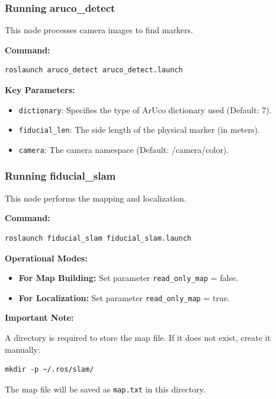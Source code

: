 \documentclass[10pt]{article}
\begin{document}
\subsubsection*{Running aruco\_detect}

This node processes camera images to find markers.

\textbf{Command:}

\begin{verbatim}
roslaunch aruco_detect aruco_detect.launch
\end{verbatim}

\textbf{Key Parameters:}
\begin{itemize}
    \item \texttt{dictionary}: Specifies the type of ArUco dictionary used (Default: 7).
    \item \texttt{fiducial\_len}: The side length of the physical marker (in meters).
    \item \texttt{camera}: The camera namespace (Default: /camera/color).
\end{itemize}

\subsubsection*{Running fiducial\_slam}

This node performs the mapping and localization.

\textbf{Command:}

\begin{verbatim}
roslaunch fiducial_slam fiducial_slam.launch
\end{verbatim}

\textbf{Operational Modes:}
\begin{itemize}
    \item \textbf{For Map Building:} Set parameter \texttt{read\_only\_map} = false.
    \item \textbf{For Localization:} Set parameter \texttt{read\_only\_map} = true.
\end{itemize}

\textbf{Important Note:}

A directory is required to store the map file. If it does not exist, create it manually:

\begin{verbatim}
mkdir -p ~/.ros/slam/
\end{verbatim}

The map file will be saved as \texttt{map.txt} in this directory.
\end{document}
